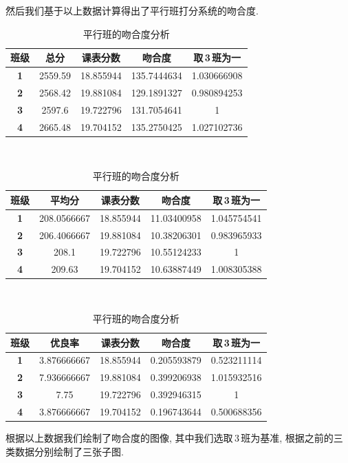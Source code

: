 \documentclass[a4paper]{article}
\begin{document}
  然后我们基于以上数据计算得出了平行班打分系统的吻合度.
  \begin{table}[H]
  \centering
  \begin{tabular}{|c|c|c|c|c|}
  \hline
  \bf 班级 & \bf 总分 & \bf 课表分数 & \bf 吻合度 & \bf 取\,3\,班为一 \\\hline
  \bf 1 & 2559.59 & 18.855944 & 135.7444634 & 1.030666908 \\\hline
  \bf 2 & 2568.42 & 19.881084 & 129.1891327 & 0.980894253 \\\hline
  \bf 3 & 2597.6 & 19.722796 & 131.7054641 & 1 \\\hline
  \bf 4 & 2665.48 & 19.704152 & 135.2750425 & 1.027102736 \\\hline
  \end{tabular}\\[2mm]
  \begin{tabular}{|c|c|c|c|c|}
  \hline
  \bf 班级 & \bf 平均分 & \bf 课表分数 & \bf 吻合度 & \bf 取\,3\,班为一 \\\hline
  \bf 1 & 208.0566667 & 18.855944 & 11.03400958 & 1.045754541 \\\hline
  \bf 2 & 206.4066667 & 19.881084 & 10.38206301 & 0.983965933 \\\hline
  \bf 3 & 208.1 & 19.722796 & 10.55124233 & 1 \\\hline
  \bf 4 & 209.63 & 19.704152 & 10.63887449 & 1.008305388 \\\hline
  \end{tabular}\\[2mm]
  \begin{tabular}{|c|c|c|c|c|}
  \hline
  \bf 班级 & \bf 优良率 & \bf 课表分数 & \bf 吻合度 & \bf 取\,3\,班为一 \\\hline
  \bf 1 & 3.876666667 & 18.855944 & 0.205593879 & 0.523211114 \\\hline
  \bf 2 & 7.936666667 & 19.881084 & 0.399206938 & 1.015932516 \\\hline
  \bf 3 & 7.75 & 19.722796 & 0.392946315 & 1 \\\hline
  \bf 4 & 3.876666667 & 19.704152 & 0.196743644 & 0.500688356 \\\hline
  \end{tabular}
  \caption{平行班的吻合度分析}
  \end{table}
  根据以上数据我们绘制了吻合度的图像, 其中我们选取\,3\,班为基准, 根据之前的三类数据分别绘制了三张子图.
\end{document}
